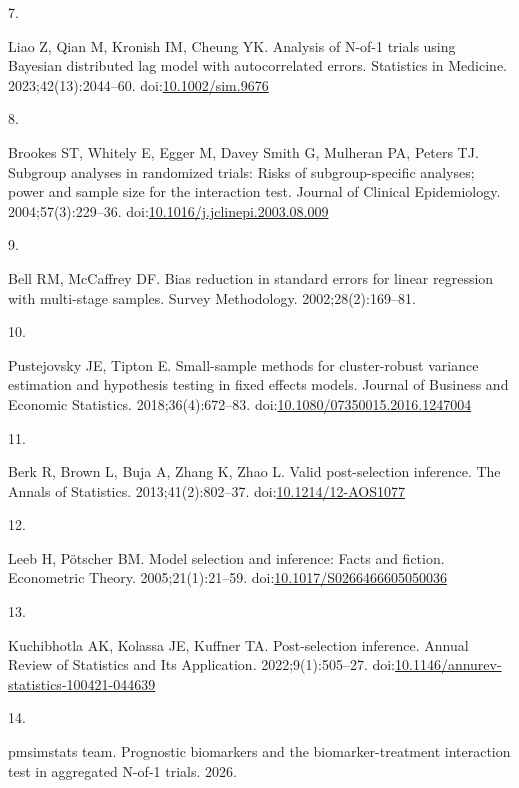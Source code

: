 \documentclass[
  11pt,
]{article}
\newlength{\cslhangindent}
\newlength{\csllabelwidth}
\newenvironment{CSLReferences}[2] %
 {\begin{list}{}{%
  \setlength{\itemindent}{0pt}
  \setlength{\leftmargin}{0pt}
  \setlength{\parsep}{0pt}
  \ifodd #1
   \setlength{\leftmargin}{\cslhangindent}
   \setlength{\itemindent}{-1\cslhangindent}
  \fi
  \setlength{\itemsep}{#2\baselineskip}}}
 {\end{list}}
\newcommand{\CSLLeftMargin}[1]{\parbox[t]{\csllabelwidth}{\strut#1\strut}}
\newcommand{\CSLRightInline}[1]{\parbox[t]{\linewidth - \csllabelwidth}{\strut#1\strut}}
\begin{document}
\begin{CSLReferences}{0}{1}
\CSLLeftMargin{7. }%
\CSLRightInline{Liao Z, Qian M, Kronish IM, Cheung YK. Analysis of {N}-of-1 trials using {B}ayesian distributed lag model with autocorrelated errors. Statistics in Medicine. 2023;42(13):2044--60. doi:\href{https://doi.org/10.1002/sim.9676}{10.1002/sim.9676}}

\CSLLeftMargin{8. }%
\CSLRightInline{Brookes ST, Whitely E, Egger M, Davey Smith G, Mulheran PA, Peters TJ. Subgroup analyses in randomized trials: Risks of subgroup-specific analyses; power and sample size for the interaction test. Journal of Clinical Epidemiology. 2004;57(3):229--36. doi:\href{https://doi.org/10.1016/j.jclinepi.2003.08.009}{10.1016/j.jclinepi.2003.08.009}}

\CSLLeftMargin{9. }%
\CSLRightInline{Bell RM, McCaffrey DF. Bias reduction in standard errors for linear regression with multi-stage samples. Survey Methodology. 2002;28(2):169--81.}

\CSLLeftMargin{10. }%
\CSLRightInline{Pustejovsky JE, Tipton E. Small-sample methods for cluster-robust variance estimation and hypothesis testing in fixed effects models. Journal of Business and Economic Statistics. 2018;36(4):672--83. doi:\href{https://doi.org/10.1080/07350015.2016.1247004}{10.1080/07350015.2016.1247004}}

\CSLLeftMargin{11. }%
\CSLRightInline{Berk R, Brown L, Buja A, Zhang K, Zhao L. Valid post-selection inference. The Annals of Statistics. 2013;41(2):802--37. doi:\href{https://doi.org/10.1214/12-AOS1077}{10.1214/12-AOS1077}}

\CSLLeftMargin{12. }%
\CSLRightInline{Leeb H, Pötscher BM. Model selection and inference: Facts and fiction. Econometric Theory. 2005;21(1):21--59. doi:\href{https://doi.org/10.1017/S0266466605050036}{10.1017/S0266466605050036}}

\CSLLeftMargin{13. }%
\CSLRightInline{Kuchibhotla AK, Kolassa JE, Kuffner TA. Post-selection inference. Annual Review of Statistics and Its Application. 2022;9(1):505--27. doi:\href{https://doi.org/10.1146/annurev-statistics-100421-044639}{10.1146/annurev-statistics-100421-044639}}

\CSLLeftMargin{14. }%
\CSLRightInline{{pmsimstats team}. Prognostic biomarkers and the biomarker-treatment interaction test in aggregated {N}-of-1 trials. 2026.}


\end{CSLReferences}
\end{document}
